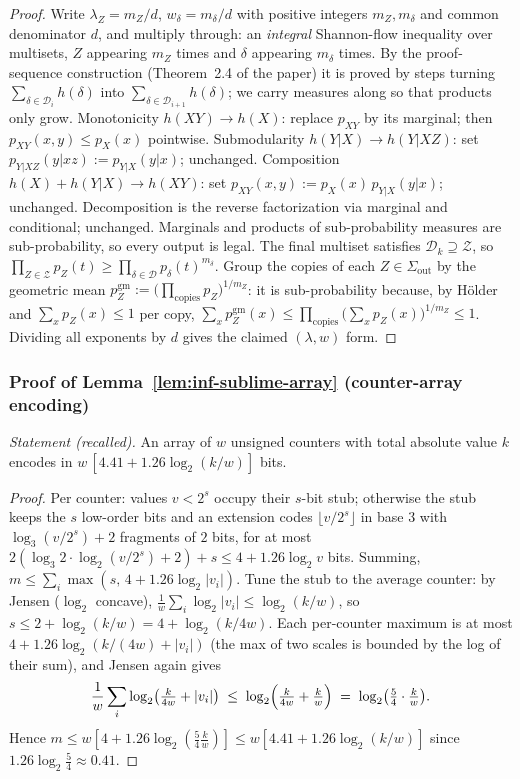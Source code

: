 \begin{proof}
Write $\lambda_Z = m_Z/d$, $w_\delta = m_\delta/d$ with positive integers $m_Z,
m_\delta$ and common denominator $d$, and multiply through: an \emph{integral}
Shannon-flow inequality over multisets, $Z$ appearing $m_Z$ times and $\delta$
appearing $m_\delta$ times. By the proof-sequence construction (Theorem~2.4 of the
paper) it is proved by steps turning $\sum_{\delta \in \mathcal{D}_i} h(\delta)$ into
$\sum_{\delta \in \mathcal{D}_{i+1}} h(\delta)$; we carry measures along so that
products only grow. Monotonicity $h(XY) \to h(X)$: replace $p_{XY}$ by its marginal;
then $p_{XY}(x,y) \le p_X(x)$ pointwise. Submodularity $h(Y|X) \to h(Y|XZ)$: set
$p_{Y|XZ}(y|xz) := p_{Y|X}(y|x)$; unchanged. Composition $h(X) + h(Y|X) \to h(XY)$:
set $p_{XY}(x,y) := p_X(x)\,p_{Y|X}(y|x)$; unchanged. Decomposition is the reverse
factorization via marginal and conditional; unchanged. Marginals and products of
sub-probability measures are sub-probability, so every output is legal. The final
multiset satisfies $\mathcal{D}_k \supseteq \mathcal{Z}$, so
$\prod_{Z \in \mathcal{Z}} p_Z(t) \ge \prod_{\delta \in \mathcal{D}}
p_\delta(t)^{m_\delta}$. Group the copies of each $Z \in \Sigma_{\mathrm{out}}$ by the
geometric mean $p_Z^{\mathrm{gm}} := \bigl(\prod_{\text{copies}} p_Z\bigr)^{1/m_Z}$:
it is sub-probability because, by H\"older and $\sum_x p_Z(x) \le 1$ per copy,
$\sum_x p_Z^{\mathrm{gm}}(x) \le \prod_{\text{copies}} \bigl(\sum_x p_Z(x)\bigr)^{1/m_Z}
\le 1$. Dividing all exponents by $d$ gives the claimed $(\lambda, w)$ form.
\end{proof}

\subsubsection*{Proof of Lemma~\ref{lem:inf-sublime-array} (counter-array encoding)}
{\itshape Statement (recalled).} An array of $w$ unsigned counters with total absolute
value $k$ encodes in $w\,[4.41 + 1.26\log_2(k/w)]$ bits.\eop

\begin{proof}
Per counter: values $v < 2^s$ occupy their $s$-bit stub; otherwise the stub keeps the
$s$ low-order bits and an extension codes $\lfloor v/2^s\rfloor$ in base $3$ with
$\log_3(v/2^s) + 2$ fragments of $2$ bits, for at most
$2(\log_3 2 \cdot \log_2(v/2^s) + 2) + s \le 4 + 1.26\log_2 v$ bits. Summing, $m \le
\sum_i \max(s,\, 4 + 1.26\log_2|v_i|)$. Tune the stub to the average counter: by
Jensen ($\log_2$ concave), $\frac1w\sum_i \log_2|v_i| \le \log_2(k/w)$, so
$s \le 2 + \log_2(k/w) = 4 + \log_2(k/4w)$. Each per-counter maximum is at most
$4 + 1.26\log_2(k/(4w) + |v_i|)$ (the max of two scales is bounded by the log of
their sum), and Jensen again gives
\[
\frac{1}{w}\sum_i \log_2\bigl(\tfrac{k}{4w} + |v_i|\bigr)
\;\le\; \log_2\Bigl(\tfrac{k}{4w} + \tfrac{k}{w}\Bigr)
\;=\; \log_2\bigl(\tfrac54\cdot\tfrac kw\bigr).
\]
Hence $m \le w[4 + 1.26\log_2(\frac54 \frac kw)] \le w[4.41 + 1.26\log_2(k/w)]$
since $1.26\log_2\frac54 \approx 0.41$.
\end{proof}



